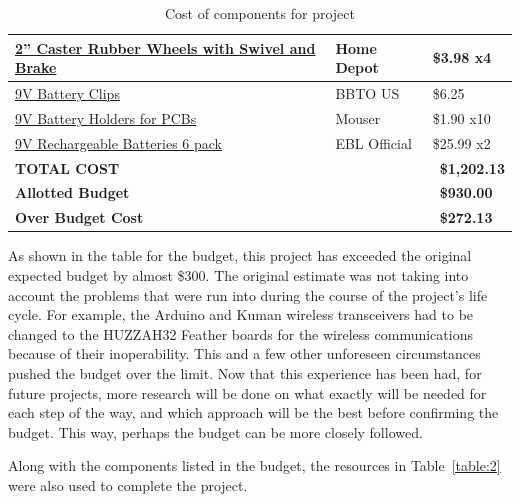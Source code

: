 \begin{table} [H]
\begin{tabular}{|l|l|l|}
		\hline
		\href{https://www.homedepot.com/}{2'' Caster Rubber Wheels with Swivel and Brake} 	& Home Depot 		& \$3.98 x4 \\
		\hline
		\href{https://www.amazon.com/gp/product/B0779ZSNS3/ref=ppx_yo_dt_b_asin_title_o01_s00?ie=UTF8\&psc=1}{9V Battery Clips} 	& BBTO US 		& \$6.25 \\
		\hline
		\href{https://www.mouser.com/ProductDetail/Keystone-Electronics/1294?qs=sGAEpiMZZMsb53hqUvtGaal96fsGiPnZeBRTs87TntQ\%3D}{9V Battery Holders for PCBs} 	& Mouser 		& \$1.90 x10 \\
		\hline
		\href{https://www.amazon.com/gp/product/B00GLK1BO2/ref=ppx_yo_dt_b_asin_title_o01_s01?ie=UTF8\&th=1}{9V Rechargeable Batteries 6 pack} 	& EBL Official 		& \$25.99 x2 \\
		\hline

		\hline
				\textbf{TOTAL COST} & & \ \textbf{\$1,202.13} \\
				\hline
				\textbf{Allotted Budget} & & \ \textbf{\$930.00} \\
				\hline
				\hline
				\textbf{Over Budget Cost} & & \ \textbf{\$272.13} \\
		\hline 
	\end{tabular} 
	\caption{Cost of components for project}
	\label{table:1}
\end{table}	

As shown in the table for the budget, this project has exceeded the original expected budget by almost \$300. The original estimate was not taking into account the problems that were run into during the course of the project's life cycle. For example, the Arduino and Kuman wireless transceivers had to be changed to the HUZZAH32 Feather boards for the wireless communications because of their inoperability. This and a few other unforeseen circumstances pushed the budget over the limit. Now that this experience has been had, for future projects, more research will be done on what exactly will be needed for each step of the way, and which approach will be the best before confirming the budget. This way, perhaps the budget can be more closely followed.\par

\setlength{\parindent}{2.5ex}Along with the components listed in the budget, the resources in Table~\ref{table:2} were also used to complete the project.

